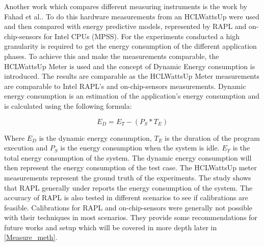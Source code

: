 Another work which compares different measuring instruments is the work by Fahad et al.\cite{fahad2019comparative}. To do this hardware measurements from an HCLWattsUp were used and then compared with energy predictive models, represented by RAPL and on-chip-sensors for Intel CPUs (MPSS). For the experiments conducted a high granularity is required to get the energy consumption of the different application phases. To achieve this and make the measurements comparable, the HCLWattsUp Meter is used and the concept of Dynamic Energy consumption is introduced. The results are comparable as the HCLWattsUp Meter measurements are comparable to Intel RAPL's and on-chip-sensors measurements. Dynamic energy consumption is an estimation of the application's energy consumption and is calculated using the following formula:\cite{fahad2019comparative}

\begin{equation}
    E_D = E_T - (P_S * T_E)
\end{equation}

Where $E_D$ is the dynamic energy consumption, $T_E$ is the duration of the program execution and $P_S$ is the energy consumption when the system is idle. $E_T$ is the total energy consumption of the system. The dynamic energy consumption will then represent the energy consumption of the test case. The HCLWattsUp meter measurements represent the ground truth of the experiments. The study shows that RAPL generally under reports the energy consumption of the system. The accuracy of RAPL is also tested in different scenarios to see if calibrations are feasible. Calibrations for RAPL and on-chip-sensors were generally not possible with their techniques in most scenarios. They provide some recommendations for future works and setup which will be covered in more depth later in \ref{Measure_meth}.